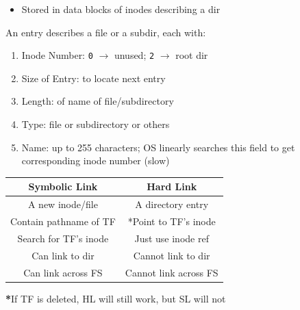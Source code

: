 \documentclass[a4paper, 12pt]{article}
\begin{document}
\begin{multicols*}{4}
\begin{itemize}
	\item Stored in data blocks of inodes describing a dir
\end{itemize}
An entry describes a file or a subdir, each with:
\begin{enumerate}
	\item Inode Number: \texttt{0} $\rightarrow$ unused; \texttt{2} $\rightarrow$ root dir
	\item Size of Entry: to locate next entry
	\item Length: of name of file/subdirectory
	\item Type: file or subdirectory or others
	\item Name: up to 255 characters; OS linearly searches this field to get corresponding inode number (slow)
\end{enumerate}
\begin{tabular}{ |c|c| }
    \hline
	\textbf{Symbolic Link} & \textbf{Hard Link} \\
	\hline
	A new inode/file & A directory entry \\
	Contain pathname of TF & *Point to TF's inode \\
	Search for TF's inode & Just use inode ref \\
	Can link to dir & Cannot link to dir \\
	Can link across FS & Cannot link across FS \\
	\hline
\end{tabular}
\textbf{*}If TF is deleted, HL will still work, but SL will not




\end{multicols*}
\end{document}
